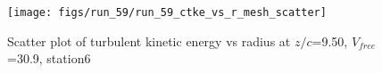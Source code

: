 \begin{figure}[H]
\centering
\texttt{[image: figs/run\_59/run\_59\_ctke\_vs\_r\_mesh\_scatter]}
\caption{Scatter plot of turbulent kinetic energy vs radius at $z/c$=9.50, $V_{free}$=30.9, station6}
\label{fig:run_59_ctke_vs_r_mesh_scatter}
\end{figure}


